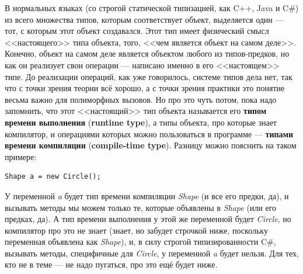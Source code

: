 \documentclass[a5paper]{article}
\begin{document}
В нормальных языках (со строгой статической типизацией, как C++, Java и C\#) из всего множества типов, которым соответствует объект, выделяется один --- тот, с которым этот объект создавался. Этот тип имеет физический смысл <<настоящего>> типа объекта, того, <<чем является объект на самом деле>>. Конечно, объект на самом деле является объектом любого из типов-предков, но как он реализует свои операции --- написано именно в его <<настоящем>> типе. До реализации операций, как уже говорилось, системе типов дела нет, так что с точки зрения теории всё хорошо, а с точки зрения практики это понятие весьма важно для полиморфных вызовов. Но про это чуть потом, пока надо запомнить, что этот <<настоящий>> тип объекта называется его \textbf{типом времени выполнения} (\textbf{runtime type}), а типы объекта, про которые знает компилятор, и операциями которых можно пользоваться в программе --- \textbf{типами времени компиляции} (\textbf{compile-time type}). Разницу можно пояснить на таком примере:

\begin{verbatim}
Shape a = new Circle();
\end{verbatim}

У переменной \textit{a} будет тип времени компиляции \textit{Shape} (и все его предки, да), и вызывать методы мы можем только те, которые объявлены в \textit{Shape} (или его предках, да). А тип времени выполнения у этой же переменной будет \textit{Circle}, но компилятор про это не знает (знает, но забудет строчкой ниже, поскольку переменная объявлена как \textit{Shape}), и, в силу строгой типизированности C\#, вызывать методы, специфичные для \textit{Circle}, у переменной \textit{a} будет нельзя. Для тех, кто не в теме --- не надо пугаться, про это ещё будет ниже.
\end{document}

